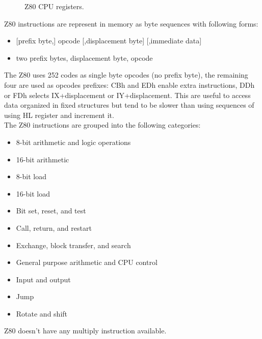 \begin{figure}
	\caption{Z80 CPU registers.}
\end{figure}

\indent Z80 instructions are represent in memory as byte sequences with following forms:
\begin{itemize}
\item {[prefix byte,]  opcode  [,displacement byte]  [,immediate data]}
\item {two prefix bytes,  displacement byte,  opcode}
\end{itemize}
\indent The Z80 uses 252 codes as single byte opcodes (no prefix byte), the remaining four are used as opcodes prefixes: CBh and EDh enable extra instructions, DDh or FDh selects IX+displacement or IY+displacement. This are useful to access data organized in fixed structures but tend to be slower than using sequences of using HL register and increment it.\\
\indent The Z80 instructions are grouped into the following categories:
\begin{itemize}
\item {8-bit arithmetic and logic operations}
\item {16-bit arithmetic}
\item {8-bit load}
\item {16-bit load}
\item {Bit set, reset, and test}
\item {Call, return, and restart}
\item {Exchange, block transfer, and search}
\item {General purpose arithmetic and CPU control}
\item {Input and output}
\item {Jump}
\item {Rotate and shift}
\end{itemize}
\indent Z80 doesn’t have any multiply instruction available.

